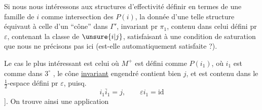 
Si nous nous intéressons aux structures d'effectivité  définir  en termes de  une famille de \uline{$i$} comme intersection des $P(i)$,  la donnée d'une telle structure équivaut à celle d'un ``cône'' dans $\Gamma'$, invariant pr $\pi_1$, contenu  dans celui défini pr $\varepsilon$, contenant la classe de $\unsure{i|j}$, satisfaisant à une condition de  saturation que nous ne précisons pas ici (est-elle automatiquement satisfaite ?).


Le cas le plus intéressant est celui où $M^+$  est défini comme $P(i_1)$, où $i_1$ est comme dans $3^\circ$ \deleted{[\unsure{en fait bien}}, \inserted{[N.B.} le cône \uline{invariant} engendré contient bien $j$, et est contenu dans le $\frac12$-espace défini pr $\varepsilon$, puisq.
\[
i_1\bar i_1=j,\qquad \varepsilon i_1=\mathrm{id}
\]
]. On trouve ainsi une application

